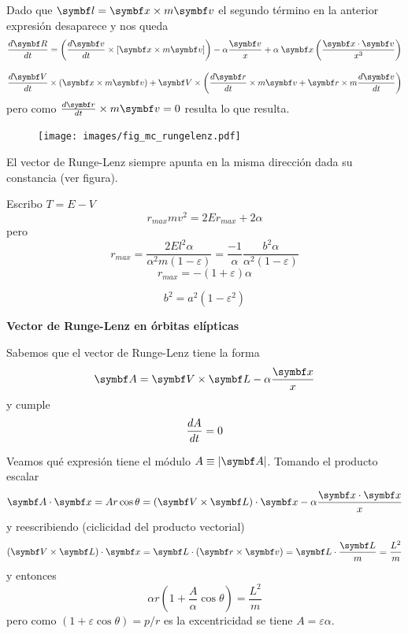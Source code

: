 \documentclass[10pt,oneside]{CBFT_book}
\begin{document}
Dado que $\vb{l} = \vb{x} \times m \vb{v}$ el segundo término en la anterior expresión desaparece y nos queda
\[
	\dtot{\vb{R}}{t} = \left( \dtot{\vb{v}}{t} \times [ \vb{x} \times m\vb{v} ] \right) 
	- \alpha\frac{ \vb{v} }{x} + \alpha \:\vb{x} \left( \frac{ \pe{x}{v} }{x^3}\right) 
\]


\[
	\dtot{\vb{V}}{t} \times ( \vb{x} \times m\vb{v} ) +
	\vb{V} \times \left( \dtot{\vb{r}}{t} \times m\vb{v} + \vb{r} \times m\dtot{\vb{v}}{t} \right)
\]
pero como $\dtot{\vb{r}}{t} \times m\vb{v} = 0$ resulta lo que resulta.
\begin{figure}[hbt]
	\begin{center}
	\texttt{[image: images/fig\_mc\_rungelenz.pdf]}	 
	\end{center}
	\caption{}
\end{figure} 

El vector de Runge-Lenz siempre apunta en la misma dirección dada su constancia (ver figura).

Escribo $ T = E - V $
\[
	r_{max} m v^2 = 2Er_{max} + 2\alpha
\]
pero 
\[
	r_{max} = \frac{2 E l^2 \alpha}{\alpha^2 m (1-\varepsilon)} = \frac{-1}{\alpha}\frac{b^2 
\alpha}{\alpha^2(1-\varepsilon)}
\]
\[
	r_{max} = - (1+\varepsilon) \alpha
\]

\[
	b^2 = a^2( 1 - \varepsilon^2 )
\]

\begin{ejemplo}{\bfseries Vector de Runge-Lenz en órbitas elípticas}

Sabemos que el vector de Runge-Lenz tiene la forma 
\[
	\vb{A} = \pv{V}{L} - \alpha \frac{\vb{x}}{x}
\]
y cumple 
\[
	\frac{d^{\hspace{-0.05em}} {A}}{d {t}^{\hspace{-0.05em}}} = 0
\]

Veamos qué expresión tiene el módulo $ A \equiv |\vb{A}| $. Tomando el producto escalar 
\[
	\pe{A}{x} = A r \cos \theta = ( \pv{V}{L} )\cdot \vb{x} - \alpha \frac{\pe{x}{x}}{x}
\]
y reescribiendo (ciclicidad del producto vectorial)
\[
	( \pv{V}{L} )\cdot \vb{x} = \vb{L} \cdot ( \pv{r}{v} ) = \vb{L} \cdot \frac{ \vb{L} }{m} = \frac{L^2}{m}
\]
y entonces
\[
	\alpha r \left( 1 + \frac{A}{\alpha} \cos \theta \right) = \frac{L^2}{m}
\]
pero como $ (1 + \varepsilon \cos \theta ) = p / r $ es la excentricidad se tiene $ A = \varepsilon \alpha $.

\end{ejemplo}

\end{document}
